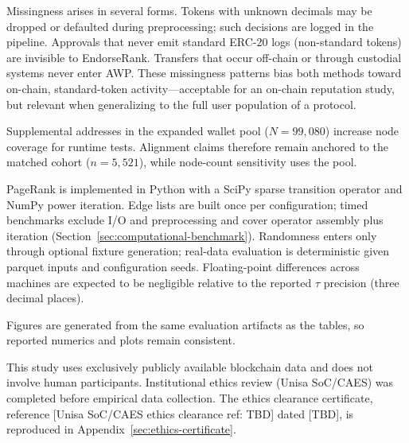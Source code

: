 Missingness arises in several forms. Tokens with unknown decimals may be dropped or defaulted during preprocessing; such decisions are logged in the pipeline. Approvals that never emit standard ERC-20 logs (non-standard tokens) are invisible to EndorseRank. Transfers that occur off-chain or through custodial systems never enter AWP. These missingness patterns bias both methods toward on-chain, standard-token activity---acceptable for an on-chain reputation study, but relevant when generalizing to the full user population of a protocol.

Supplemental addresses in the expanded wallet pool ($N=99{,}080$) increase node coverage for runtime tests. Alignment claims therefore remain anchored to the matched cohort ($n=5{,}521$), while node-count sensitivity uses the pool.


PageRank is implemented in Python with a SciPy sparse transition operator and NumPy power iteration. Edge lists are built once per configuration; timed benchmarks exclude I/O and preprocessing and cover operator assembly plus iteration (Section~\ref{sec:computational-benchmark}). Randomness enters only through optional fixture generation; real-data evaluation is deterministic given parquet inputs and configuration seeds. Floating-point differences across machines are expected to be negligible relative to the reported $\tau$ precision (three decimal places).

Figures are generated from the same evaluation artifacts as the tables, so reported numerics and plots remain consistent.


This study uses exclusively publicly available blockchain data and does not involve human participants. Institutional ethics review (Unisa SoC/CAES) was completed before empirical data collection. The ethics clearance certificate, reference [Unisa SoC/CAES ethics clearance ref: TBD] dated [TBD], is reproduced in Appendix~\ref{sec:ethics-certificate}.

